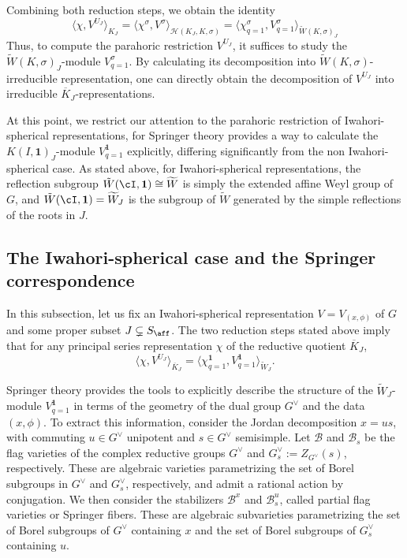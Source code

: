 Combining both reduction steps, we obtain the identity
\begin{equation}\label{eqn:reduction_steps}
    \langle\chi,V^{U_J}\rangle_{K_J}=\langle\chi^\sigma,V^\sigma\rangle_{\mathcal{H}(K_J,K,\sigma)}=\langle\chi^\sigma_{q=1},V^\sigma_{q=1}\rangle_{\tilde{W}(K,\sigma)_J}
\end{equation}
Thus, to compute the parahoric restriction $V^{U_J}$, it suffices to study the $\tilde{W}(K,\sigma)_J$-module $V_{q=1}^\sigma$. By calculating its decomposition into $\tilde{W}(K,\sigma)$-irreducible representation, one can directly obtain the decomposition of $V^{U_J}$ into irreducible $\overline{K}_J$-representations. 

At this point, we restrict our attention to the parahoric restriction of Iwahori-spherical representations, for Springer theory provides a way to calculate the $K(I,\mathbf{1})_J$-module $V^\mathbf{1}_{q=1}$ explicitly, differing significantly from the non Iwahori-spherical case. As stated above, for Iwahori-spherical representations, the reflection subgroup $\tilde{W}(\cI,\mathbf{1})\cong\widetilde{W}$ is simply the extended affine Weyl group of $G$, and $\tilde{W}(\cI,\mathbf{1})=\widetilde{W}_J$ is the subgroup of $\widetilde{W}$ generated by the simple reflections of the roots in $J$.

\subsection{The Iwahori-spherical case and the Springer correspondence}

In this subsection, let us fix an Iwahori-spherical representation $V=V_{(x,\phi)}$ of $G$ and some proper subset $J\subsetneq S_{\aff}$. The two reduction steps stated above imply that for any principal series representation $\chi$ of the reductive quotient $\overline{K}_J$, 
\begin{equation}\label{eqn:multiplicity_Iwahori}
    \langle\chi,V^{U_J}\rangle_{\overline{K}_J}=\langle\chi^\mathbf{1}_{q=1},V^\mathbf{1}_{q=1}\rangle_{\widetilde{W}_J}.
\end{equation}

Springer theory provides the tools to explicitly describe the structure of the $\widetilde{W}_J$-module $V^\mathbf{1}_{q=1}$ in terms of the geometry of the dual group $G^\vee$ and the data $(x,\phi)$. To extract this information, consider the Jordan decomposition $x=us$, with commuting $u\in G^\vee$ unipotent and $s\in G^\vee$ semisimple. Let $\mathcal{B}$ and $\mathcal{B}_s$ be the flag varieties of the complex reductive groups $G^\vee$ and $G^\vee_s:=Z_{G^\vee}(s)$, respectively. These are algebraic varieties parametrizing the set of Borel subgroups in $G^\vee$ and $G^\vee_s$, respectively, and admit a rational action by conjugation. We then consider the stabilizers $\mathcal{B}^x$ and $\mathcal{B}_s^u$, called partial flag varieties or Springer fibers. These are algebraic subvarieties parametrizing the set of Borel subgroups of $G^\vee$ containing $x$ and the set of Borel subgroups of $G^\vee_s$ containing $u$. 

